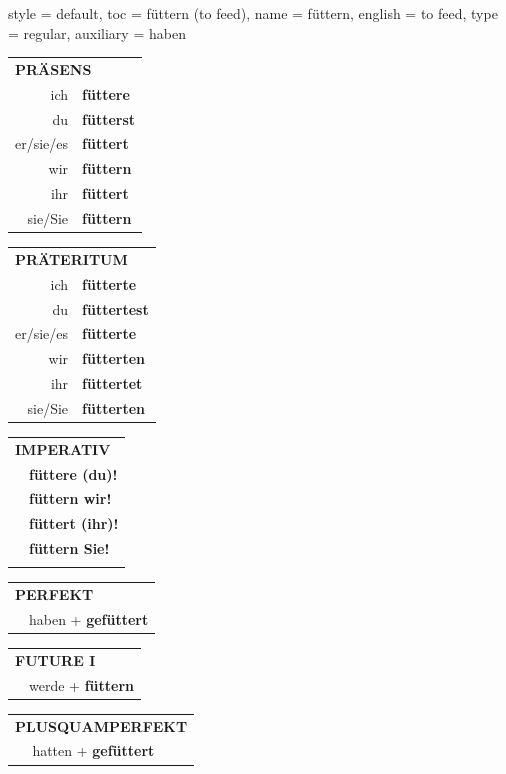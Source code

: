 \begin{verbentry}{
  style = {default},
  toc = {füttern (to feed)},
  name = {füttern},
  english = {to feed},
  type = {regular},
  auxiliary = {haben}
}
  \begin{tabular}{rl}
     \multicolumn{2}{l}{\textbf{PRÄSENS} }\\
    ich & \textbf{füttere}\\
    du & \textbf{fütterst}\\
    er/sie/es & \textbf{füttert}\\
    wir & \textbf{füttern}\\
    ihr & \textbf{füttert}\\
    sie/Sie & \textbf{füttern}\\
  \end{tabular}
  \hfill
     \begin{tabular}{rl}
    \multicolumn{2}{l}{\textbf{PRÄTERITUM} }\\
    ich & \textbf{fütterte}\\
    du & \textbf{füttertest}\\
    er/sie/es & \textbf{fütterte}\\
    wir & \textbf{fütterten}\\
    ihr & \textbf{füttertet}\\
    sie/Sie & \textbf{fütterten}\\
  \end{tabular}
  \hfill
  \begin{tabular}{rl}
     \multicolumn{2}{l}{\textbf{IMPERATIV} }\\
   & \textbf{füttere (du)!}\\
   & \textbf{füttern wir!}\\
   & \textbf{füttert (ihr)!}\\
   & \textbf{füttern Sie!}\\
   & \vspace{10pt}
  \end{tabular}

    \vspace{10pt}

 \begin{tabular}{rl}
     \multicolumn{2}{l}{\textbf{PERFEKT}}\\
   & haben + \textbf{gefüttert}\\
  \end{tabular}
\hfill
   \begin{tabular}{rl}
    \multicolumn{2}{l}{\textbf{FUTURE I} }\\
   & werde + \textbf{füttern}\\
  \end{tabular}
\hfill
   \begin{tabular}{rl}
      \multicolumn{2}{l}{\textbf{PLUSQUAMPERFEKT}}\\
   & hatten + \textbf{gefüttert}\\
  \end{tabular}


\end{verbentry}
